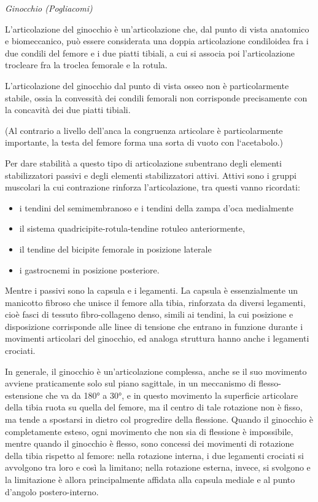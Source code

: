 \documentclass[]{article}
\date{}
\begin{document}
\emph{Ginocchio (Pogliacomi)}

L'articolazione del ginocchio è un'articolazione che, dal punto di vista
anatomico e biomeccanico, può essere considerata una doppia
articolazione condiloidea fra i due condili del femore e i due piatti
tibiali, a cui si associa poi l'articolazione trocleare fra la troclea
femorale e la rotula.

L'articolazione del ginocchio dal punto di vista osseo non è
particolarmente stabile, ossia la convessità dei condili femorali non
corrisponde precisamente con la concavità dei due piatti tibiali.

(Al contrario a livello dell'anca la congruenza articolare è
particolarmente importante, la testa del femore forma una sorta di vuoto
con l`acetabolo.)

Per dare stabilità a questo tipo di articolazione subentrano degli
elementi stabilizzatori passivi e degli elementi stabilizzatori attivi.
Attivi sono i gruppi muscolari la cui contrazione rinforza
l'articolazione, tra questi vanno ricordati:

\begin{itemize}
\item
  i tendini del semimembranoso e i tendini della zampa d'oca medialmente
\item
  il sistema quadricipite-rotula-tendine rotuleo anteriormente,
\item
  il tendine del bicipite femorale in posizione laterale
\item
  i gastrocnemi in posizione posteriore.
\end{itemize}

Mentre i passivi sono la capsula e i legamenti. La capsula è
essenzialmente un manicotto fibroso che unisce il femore alla tibia,
rinforzata da diversi legamenti, cioè fasci di tessuto fibro-collageno
denso, simili ai tendini, la cui posizione e disposizione corrisponde
alle linee di tensione che entrano in funzione durante i movimenti
articolari del ginocchio, ed analoga struttura hanno anche i legamenti
crociati.

In generale, il ginocchio è un'articolazione complessa, anche se il suo
movimento avviene praticamente solo sul piano sagittale, in un
meccanismo di flesso-estensione che va da 180° a 30°, e in questo
movimento la superficie articolare della tibia ruota su quella del
femore, ma il centro di tale rotazione non è fisso, ma tende a spostarsi
in dietro col progredire della flessione. Quando il ginocchio è
completamente esteso, ogni movimento che non sia di flessione è
impossibile, mentre quando il ginocchio è flesso, sono concessi dei
movimenti di rotazione della tibia rispetto al femore: nella rotazione
interna, i due legamenti crociati si avvolgono tra loro e così la
limitano; nella rotazione esterna, invece, si svolgono e la limitazione
è allora principalmente affidata alla capsula mediale e al punto
d'angolo postero-interno.
\end{document}
